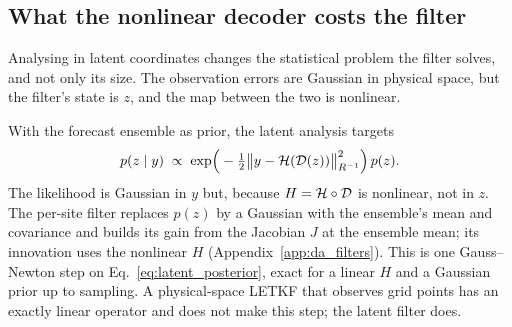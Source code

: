\subsection{What the nonlinear decoder costs the filter}
\label{sec:nonlinear}

Analysing in latent coordinates changes the statistical problem the
filter solves, and not only its size. The observation errors are Gaussian
in physical space, but the filter's state is $z$, and the map between the
two is nonlinear.

 With the
forecast ensemble as prior, the latent analysis targets
\begin{equation}
  p(z\mid y) \;\propto\; \exp\!\Big(-\tfrac12\big\|y-\mathcal{H}(\mathcal{D}(z))\big\|^2_{R^{-1}}\Big)\,p(z).
  \label{eq:latent_posterior}
\end{equation}
The likelihood is Gaussian in $y$ but, because $H=\mathcal{H}\circ\mathcal{D}$ is
nonlinear, not in $z$. The per-site filter replaces $p(z)$ by a Gaussian
with the ensemble's mean and covariance and builds its gain from the
Jacobian $J$ at the ensemble mean; its innovation uses the nonlinear $H$
(Appendix~\ref{app:da_filters}). This is one Gauss--Newton step on
Eq.~\eqref{eq:latent_posterior}, exact for a linear $H$ and a Gaussian
prior up to sampling. A physical-space LETKF that observes grid points
has an exactly linear operator and does not make this step; the latent
filter does.

